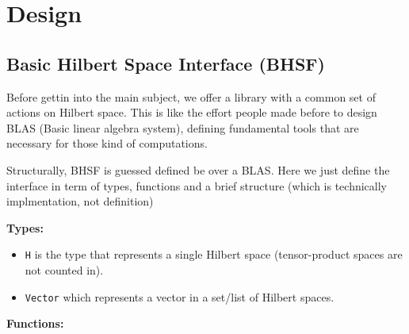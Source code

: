 \documentclass[a4paper,11pt]{article}
\def\co{\lstinline}
\begin{document}
\section{Design}

\subsection{Basic Hilbert Space Interface (BHSF)}

Before gettin into the main subject, we offer a library with a common set of actions on
Hilbert space.
This is like the effort people made before to design BLAS (Basic linear algebra system),
defining fundamental tools that are necessary for those kind of computations.

Structurally, BHSF is guessed defined be over a BLAS. Here we just define the interface
in term of types, functions and a brief structure (which is technically implmentation, not definition)


\textbf{Types: }
\begin{itemize}
    \item \co|H| is the type that represents a single Hilbert space (tensor-product spaces are not counted in).
	\item \co|Vector| which represents a vector in a set/list of Hilbert spaces.
\end{itemize}

\textbf{Functions: }
\end{document}

